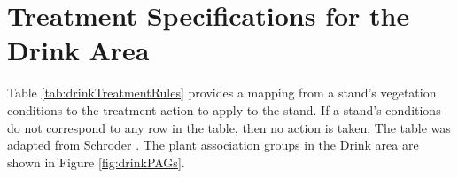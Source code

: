 
\chapter{Treatment Specifications for the Drink Area}
\label{chap:appBTreatmentSpec}

Table \ref{tab:drinkTreatmentRules} provides a mapping from a stand's vegetation conditions to the treatment action to apply to the stand. If a stand's conditions do not correspond to any row in the table, then no action is taken. The table was adapted from Schroder \cite{schroder2016multi}. The plant association groups in the Drink area are shown in Figure \ref{fig:drinkPAGs}.

